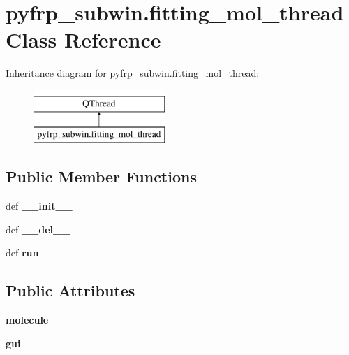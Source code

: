 \hypertarget{classpyfrp__subwin_1_1fitting__mol__thread}{\section{pyfrp\+\_\+subwin.\+fitting\+\_\+mol\+\_\+thread Class Reference}
\label{classpyfrp__subwin_1_1fitting__mol__thread}
}
Inheritance diagram for pyfrp\+\_\+subwin.\+fitting\+\_\+mol\+\_\+thread\+:\begin{figure}[H]
\begin{center}
\leavevmode
\includegraphics[height=2.000000cm]{classpyfrp__subwin_1_1fitting__mol__thread}
\end{center}
\end{figure}
\subsection*{Public Member Functions}
\begin{DoxyCompactItemize}
\item 
\hypertarget{classpyfrp__subwin_1_1fitting__mol__thread_a12fba29d0487404c420b403d0891e7f2}{def {\bfseries \+\_\+\+\_\+init\+\_\+\+\_\+}}\label{classpyfrp__subwin_1_1fitting__mol__thread_a12fba29d0487404c420b403d0891e7f2}

\item 
\hypertarget{classpyfrp__subwin_1_1fitting__mol__thread_a70ccdacc480cd750b34d1e54eb717f91}{def {\bfseries \+\_\+\+\_\+del\+\_\+\+\_\+}}\label{classpyfrp__subwin_1_1fitting__mol__thread_a70ccdacc480cd750b34d1e54eb717f91}

\item 
\hypertarget{classpyfrp__subwin_1_1fitting__mol__thread_a86a849ef2edbae1a51834603c3a3b2c8}{def {\bfseries run}}\label{classpyfrp__subwin_1_1fitting__mol__thread_a86a849ef2edbae1a51834603c3a3b2c8}

\end{DoxyCompactItemize}
\subsection*{Public Attributes}
\begin{DoxyCompactItemize}
\item 
\hypertarget{classpyfrp__subwin_1_1fitting__mol__thread_abbc0a9d7343ad3510830ef8045a8afe3}{{\bfseries molecule}}\label{classpyfrp__subwin_1_1fitting__mol__thread_abbc0a9d7343ad3510830ef8045a8afe3}

\item 
\hypertarget{classpyfrp__subwin_1_1fitting__mol__thread_a9980778539d2aa614d5140fc1c724944}{{\bfseries gui}}\label{classpyfrp__subwin_1_1fitting__mol__thread_a9980778539d2aa614d5140fc1c724944}

\end{DoxyCompactItemize}

